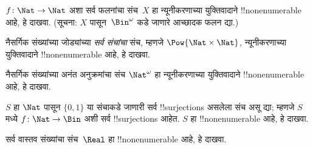 \documentclass[../../../include/open-logic-section]{subfiles}
\begin{document}
\begin{prob}\label{sfr:siz:red:prob:nat-nat}
  $f\colon \Nat \to \Nat$ अशा सर्व फलनांचा संच~$X$ हा
  न्यूनीकरणाच्या युक्तिवादाने !!{nonenumerable} आहे, हे दाखवा.
  (सूचना: $X$ पासून~$\Bin^\omega$ कडे जाणारे आच्छादक फलन द्या.)
\end{prob}

\begin{prob}
नैसर्गिक संख्यांच्या जोड्यांच्या \emph{सर्व संचांचा} संच, म्हणजे
$\Pow{\Nat \times \Nat}$, न्यूनीकरणाच्या युक्तिवादाने
!!{nonenumerable} आहे, हे दाखवा.
\end{prob}

\begin{prob}
नैसर्गिक संख्यांच्या अनंत अनुक्रमांचा संच $\Nat^\omega$ हा
न्यूनीकरणाच्या युक्तिवादाने !!{nonenumerable} आहे, हे दाखवा.
\end{prob}


\begin{prob}
$S$ हा $\Nat$ पासून $\{0,1\}$ या संचाकडे जाणारी सर्व
!!{surjection}s असलेला संच असू द्या; म्हणजे $S$ मध्ये
$f \colon \Nat \to \Bin$ अशी सर्व !!{surjection}s आहेत. $S$ हा
!!{nonenumerable} आहे, हे दाखवा.
\end{prob}

\begin{prob}
सर्व वास्तव संख्यांचा संच~$\Real$ हा !!{nonenumerable} आहे, हे दाखवा.
\end{prob}
\end{document}
